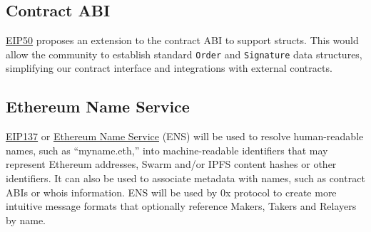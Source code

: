 \documentclass[10pt]{article}
\begin{document}
\subsection{Contract ABI}

\href{https://github.com/ethereum/EIPs/issues/50}{EIP50} proposes an extension to the contract ABI to support structs. This would allow the community to establish standard \texttt{Order} and \texttt{Signature} data structures, simplifying our contract interface and integrations with external contracts.

\subsection{Ethereum Name Service}

\href{https://github.com/ethereum/EIPs/issues/137}{EIP137} or \href{https://media.readthedocs.org/pdf/ens/latest/ens.pdf}{Ethereum Name Service} (ENS) will be used to resolve human-readable names, such as ``myname.eth,'' into machine-readable identifiers that may represent Ethereum addresses, Swarm and/or IPFS content hashes or other identifiers. It can also be used to associate metadata with names, such as contract ABIs or whois information. ENS will be used by 0x protocol to create more intuitive message formats that optionally reference Makers, Takers and Relayers by name. 

\pagebreak

{}

   
\end{document}
